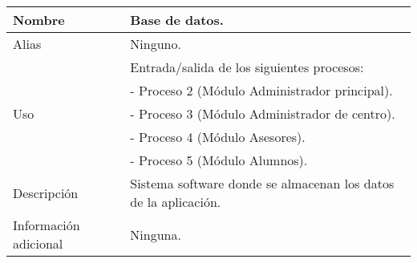 \begin{center}
  \begin{tabular}{| l | p{9cm} |}
    \hline
    Nombre & \textbf{Base de datos}.\\
    \hline
    Alias & Ninguno.\\
    \hline
    \multirow{5}{*}{Uso} & Entrada/salida de los siguientes procesos:\\
                         & - Proceso 2 (Módulo Administrador principal).\\
                         & - Proceso 3 (Módulo Administrador de centro).\\
                         & - Proceso 4 (Módulo Asesores).\\
                         & - Proceso 5 (Módulo Alumnos).\\
    \hline
    Descripción & Sistema software donde se almacenan los datos de la
                  aplicación.\\
    \hline
    Información adicional & Ninguna.\\
    \hline
  \end{tabular}
\end{center}
